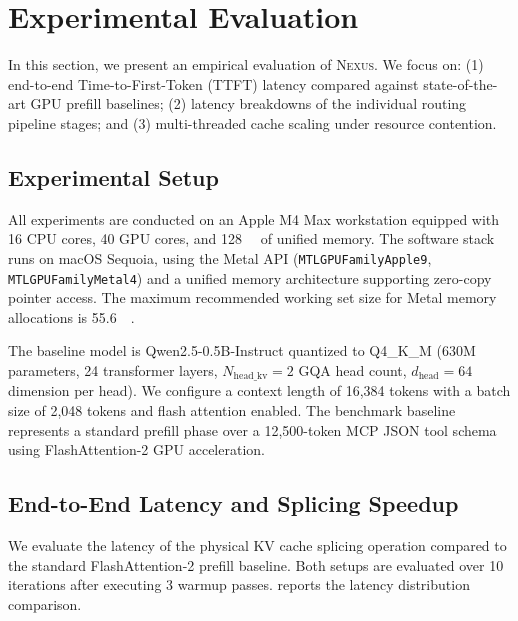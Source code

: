 \documentclass[conference,10pt]{IEEEtran}
\newcommand{\Nexus}{\textsc{Nexus}\xspace}
\begin{document}

\section{Experimental Evaluation}
\label{sec:evaluation}

In this section, we present an empirical evaluation of \Nexus. We focus on:
(1) end-to-end Time-to-First-Token (TTFT) latency compared against state-of-the-art GPU prefill baselines;
(2) latency breakdowns of the individual routing pipeline stages; and
(3) multi-threaded cache scaling under resource contention.

\subsection{Experimental Setup}
\label{subsec:eval-setup}

All experiments are conducted on an Apple M4 Max workstation equipped with 16 CPU cores,
40 GPU cores, and \SI{128}{\giga\byte} of unified memory. The software stack runs on macOS Sequoia, using the Metal API (\texttt{MTLGPUFamilyApple9}, \texttt{MTLGPUFamilyMetal4}) and a unified memory architecture supporting zero-copy pointer access. The maximum recommended working set size for Metal memory allocations is \SI{55.6}{\giga\byte}.

The baseline model is Qwen2.5-0.5B-Instruct quantized to Q4\_K\_M (630M parameters, 24 transformer layers, $N_{\text{head\_kv}} = 2$ GQA head count, $d_{\text{head}} = 64$ dimension per head). We configure a context length of 16,384 tokens with a batch size of 2,048 tokens and flash attention enabled. The benchmark baseline represents a standard prefill phase over a 12,500-token MCP JSON tool schema using FlashAttention-2 GPU acceleration.

\subsection{End-to-End Latency and Splicing Speedup}
\label{subsec:eval-latency}

We evaluate the latency of the physical KV cache splicing operation compared to the standard FlashAttention-2 prefill baseline. Both setups are evaluated over 10 iterations after executing 3 warmup passes.  reports the latency distribution comparison.
\end{document}
